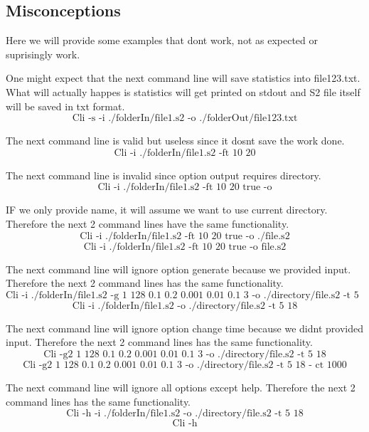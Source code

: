 \documentclass[english]{article}
\begin{document}
\subsection{Misconceptions}
Here we will provide some examples that dont work, not as expected or suprisingly work.

One might expect that the next command line will save statistics into file123.txt. What will actually happes is statistics will get printed on stdout and S2 file itself will be saved in txt format.
$$\text{Cli -s -i ./folderIn/file1.s2 -o ./folderOut/file123.txt}$$

The next command line is valid but useless since it dosnt save the work done.
$$\text{Cli -i ./folderIn/file1.s2 -ft 10 20}$$

The next command line is invalid since option output requires directory.
$$\text{Cli -i ./folderIn/file1.s2 -ft 10 20 true -o}$$

IF we only provide name, it will assume we want to use current directory. Therefore the next 2 command lines have the same functionality.
$$\text{Cli -i ./folderIn/file1.s2 -ft 10 20 true -o ./file.s2}$$
$$\text{Cli -i ./folderIn/file1.s2 -ft 10 20 true -o file.s2}$$

The next command line will ignore option generate because we provided input. Therefore the next 2 command lines has the same functionality.
$$\text{Cli -i ./folderIn/file1.s2 -g 1 128 0.1 0.2 0.001 0.01 0.1 3 -o ./directory/file.s2 -t 5 18}$$
$$\text{Cli -i ./folderIn/file1.s2 -o ./directory/file.s2 -t 5 18}$$

The next command line will ignore option change time because we didnt provided input. Therefore the next 2 command lines has the same functionality.
$$\text{Cli -g2 1 128 0.1 0.2 0.001 0.01 0.1 3 -o ./directory/file.s2 -t 5 18}$$
$$\text{Cli -g2 1 128 0.1 0.2 0.001 0.01 0.1 3 -o ./directory/file.s2 -t 5 18 - ct 1000}$$

The next command line will ignore all options except help. Therefore the next 2 command lines has the same functionality.
$$\text{Cli -h -i ./folderIn/file1.s2 -o ./directory/file.s2 -t 5 18}$$
$$\text{Cli -h}$$
\end{document}
